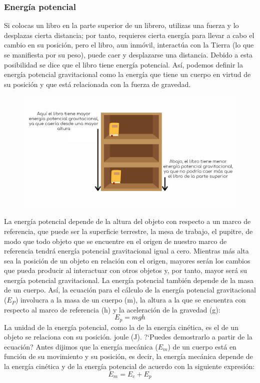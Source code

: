 \documentclass[11pt]{book}
\begin{document}
\subsubsection{Energ\'ia potencial}
Si colocas un libro en la parte superior de un librero, utilizas una fuerza y
lo desplazas cierta distancia; por tanto, requieres cierta energ\'ia para llevar
a cabo el cambio en su posici\'on, pero el libro, aun inm\'ovil, interact\'ua con la
Tierra (lo que se
manifiesta por su peso), puede caer y desplazarse una distancia. Debido a esta
posibilidad se dice que el libro tiene energ\'ia potencial. As\'i, podemos definir
la energ\'ia
potencial gravitacional como la energ\'ia que tiene un cuerpo en virtud de su
posici\'on
y que est\'a relacionada con la fuerza de gravedad.
\begin{figure}[H]
  \centering
  \includegraphics[width=\linewidth]{./Images/Gravitational-potential-energy.png}
\end{figure}%
La energ\'ia potencial depende de la altura del objeto con respecto a un marco de
referencia, que puede ser la superficie terrestre, la mesa de trabajo, el
pupitre,
de modo que todo objeto que se encuentre en el origen de nuestro marco de
referencia tendr\'a energ\'ia potencial gravitacional igual a cero. Mientras m\'as
alta sea la posici\'on de un objeto en relaci\'on con el origen, mayores ser\'an los
cambios que pueda
producir al interactuar con otros objetos y, por tanto, mayor ser\'a su energ\'ia
potencial
gravitacional.
La energ\'ia potencial tambi\'en depende de la masa de un cuerpo. As\'i, la
ecuaci\'on para el c\'alculo de la energ\'ia potencial gravitacional ($E_P$) involucra
a la masa de un cuerpo (m), la altura a la que se encuentra con respecto al
marco de referencia (h) y la aceleraci\'on de la gravedad (g):
\begin{equation*}
  E_p=mgh
\end{equation*}
La unidad de la energ\'ia potencial, como la de la energ\'ia cin\'etica, es el de un
objeto se relaciona con
su posici\'on.
joule (J). ?`Puedes demostrarlo a partir de la ecuaci\'on?
Antes dijimos que la energ\'ia mec\'anica ($E_m$) de un cuerpo est\'a en funci\'on de su
movimiento y su posici\'on, es decir, la energ\'ia mec\'anica depende de la energ\'ia
cin\'etica y de la energ\'ia potencial de acuerdo con la siguiente expresi\'on:
\begin{equation*}
  E_m=E_c+E_p
\end{equation*}
\end{document}
